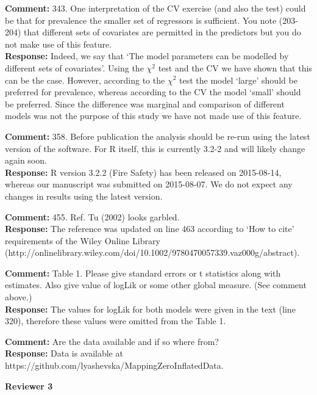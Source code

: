 \documentclass{letter}
\begin{document}
\begin{letter}
\textbf{Comment:} 
343. One interpretation of the CV exercise (and also the test) could be that for prevalence the smaller set of regressors is sufficient. You note (203-204) that different sets of covariates are permitted in the predictors but you do not make use of this feature.\\
\textbf{Response:} Indeed, we say that `The model parameters can be modelled by different sets of covariates'. Using the $\chi^2$ test and the CV we have shown that this can be the case. However, according to the $\chi^2$ test the model `large' should be preferred for prevalence, whereas according to the CV the model `small' should be preferred. Since the difference was marginal and comparison of different models was not the purpose of this study we have not made use of this feature. 

\textbf{Comment:} 
358. Before publication the analysis should be re-run using the latest version of the software. For R itself, this is currently 3.2-2 and will likely change again soon.\\
\textbf{Response:} R version 3.2.2 (Fire Safety) has been released on 2015-08-14, whereas our manuscript was submitted on 2015-08-07.  We do not expect any changes in results using the latest version.

\textbf{Comment:} 
455. Ref. Tu (2002) looks garbled.\\
\textbf{Response:} The reference was updated on line 463 according to `How to cite' requirements of the Wiley Online Library (http://onlinelibrary.wiley.com/doi/10.1002/9780470057339.vaz000g/abstract).

\textbf{Comment:} 
Table 1. Please give standard errors or t statistics along with estimates. Also give value of logLik or some other global measure. (See comment above.)\\
\textbf{Response:} The values for logLik for both models were given in the text (line 320), therefore these values were omitted from the Table 1. 

\textbf{Comment:} 
Are the data available and if so where from?\\
\textbf{Response:} Data is available at https://github.com/lyashevska/MappingZeroInflatedData.

\textbf{Reviewer 3}\\


\end{letter}
\end{document}
